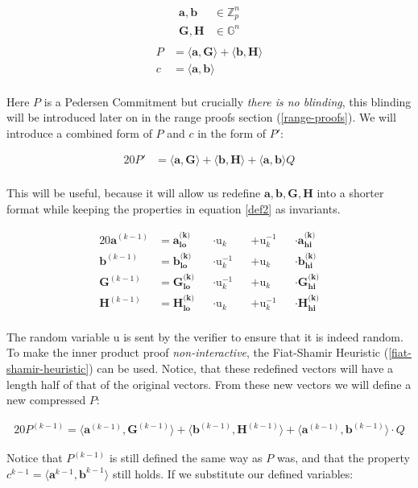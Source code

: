 \documentclass{article}
\newcommand{\eq}[1]{\begin{alignat*}{20}#1\end{alignat*}}
\newcommand{\eqn}[2]{\begin{equation}\label{#1}\begin{split}#2\end{split}\end{equation}}
\renewcommand{\vec}[1]{\boldsymbol{#1}}
\newcommand{\ran}[1]{\mathrm{#1}}
\newcommand{\G}{\mathbb{G}}
\newcommand{\Z}{\mathbb{Z}}
\newcommand{\dotp}[2]{\langle #1, #2 \rangle}
\newcommand{\opn}[1]{\operatorname{#1}}
\newcommand{\veclo}[1]{\vec{#1_{\opn{lo}}}}
\newcommand{\vechi}[1]{\vec{#1_{\opn{hi}}}}
\begin{document}
\eqn{def1}{
	\vec{a}, \vec{b} &\in \Z^n_p \\
	\vec{G}, \vec{H} &\in \G^n \\
}
\eqn{def2}{
	P &= \dotp{\vec{a}}{\vec{G}} + \dotp{\vec{b}}{\vec{H}} \\
	c &= \dotp{\vec{a}}{\vec{b}} \\
}

Here $P$ is a Pedersen Commitment but crucially \textit{there is no
blinding}, this blinding will be introduced later on in the range proofs
section (\ref{range-proofs}). We will introduce a combined form of $P$
and $c$ in the form of $P'$:

\eq{
	P' &= \dotp{\vec{a}}{\vec{G}} +
	      \dotp{\vec{b}}{\vec{H}} +
	      \dotp{\vec{a}}{\vec{b}}Q \\
}

This will be useful, because it will allow us redefine $\vec{a},
\vec{b}, \vec{G}, \vec{H}$ into a shorter format while keeping the
properties in equation \ref{def2} as invariants.

\eq{
	\vec{a}^{(k-1)} &= \veclo{a^{\text{(k)}}} &&\cdot \ran{u}_k      &&+ \ran{u}^{-1}_k &&\cdot \vechi{a^{\text{(k)}}} \\
	\vec{b}^{(k-1)} &= \veclo{b^{\text{(k)}}} &&\cdot \ran{u}^{-1}_k &&+ \ran{u}_k      &&\cdot \vechi{b^{\text{(k)}}} \\
	\vec{G}^{(k-1)} &= \veclo{G^{\text{(k)}}} &&\cdot \ran{u}^{-1}_k &&+ \ran{u}_k      &&\cdot \vechi{G^{\text{(k)}}} \\
	\vec{H}^{(k-1)} &= \veclo{H^{\text{(k)}}} &&\cdot \ran{u}_k      &&+ \ran{u}^{-1}_k &&\cdot \vechi{H^{\text{(k)}}} \\
}

The random variable $\ran{u}$ is sent by the verifier to
ensure that it is indeed random. To make the inner product
proof \textit{non-interactive}, the Fiat-Shamir Heuristic
(\ref{fiat-shamir-heuristic}) can be used.  Notice, that these redefined
vectors will have a length half of that of the original vectors. From
these new vectors we will define a new compressed $P$:

\eq{
	P^{(k-1)} =
	\dotp{\vec{a}^{(k-1)}}{\vec{G}^{(k-1)}} +
	\dotp{\vec{b}^{(k-1)}}{\vec{H}^{(k-1)}} +
	\dotp{\vec{a}^{(k-1)}}{\vec{b}^{(k-1)}} \cdot Q
}

Notice that $P^{(k-1)}$ is still defined the same way as $P$ was,
and that the property $c^{k-1} = \dotp{\vec{a}^{k-1}}{\vec{b}^{k-1}}$
still holds. If we substitute our defined variables:
\end{document}
